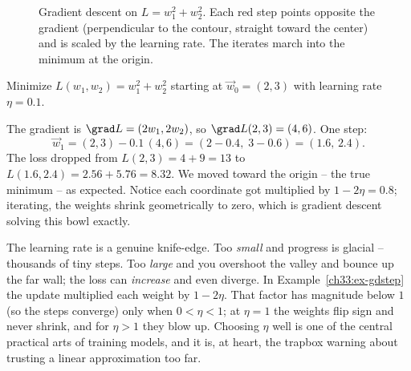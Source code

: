 \begin{figure}[H]
\centering
{}
\caption{Gradient descent on $L=w_1^2+w_2^2$. Each red step points opposite the
gradient (perpendicular to the contour, straight toward the center) and is scaled
by the learning rate. The iterates march into the minimum at the origin.}
\label{ch33:fig-gd}
\end{figure}

\begin{example}
\label{ch33:ex-gdstep}
Minimize $L(w_1,w_2)=w_1^2 + w_2^2$ starting at $\vec w_0=(2,3)$ with learning
rate $\eta=0.1$.

The gradient is $\grad L = (2w_1, 2w_2)$, so $\grad L(2,3) = (4,6)$. One step:
\[
  \vec w_1 = (2,3) - 0.1\,(4,6) = (2-0.4,\; 3-0.6) = (1.6,\,2.4).
\]
The loss dropped from $L(2,3)=4+9=13$ to $L(1.6,2.4)=2.56+5.76=8.32$. We moved
toward the origin -- the true minimum -- as expected. Notice each coordinate got
multiplied by $1-2\eta = 0.8$; iterating, the weights shrink geometrically to
zero, which is gradient descent solving this bowl exactly.
\end{example}

\begin{trapbox}
The learning rate is a genuine knife-edge. Too \emph{small} and progress is
glacial -- thousands of tiny steps. Too \emph{large} and you overshoot the valley
and bounce up the far wall; the loss can \emph{increase} and even diverge. In
Example~\ref{ch33:ex-gdstep} the update multiplied each weight by $1-2\eta$. That
factor has magnitude below $1$ (so the steps converge) only when $0<\eta<1$; at
$\eta=1$ the weights flip sign and never shrink, and for $\eta>1$ they blow up.
Choosing $\eta$ well is one of the central practical arts of training models, and
it is, at heart, the trapbox warning about trusting a linear approximation too far.
\end{trapbox}

